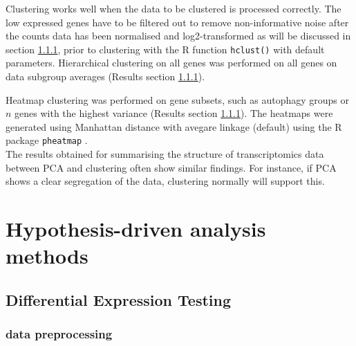     Clustering works well when the data to be clustered is processed correctly. The low expressed genes have to be filtered out to remove non-informative noise after the counts data has been normalised and log2-transformed as will be discussed in section \ref{}, prior to clustering with the R function \texttt{hclust()} with default parameters. Hierarchical clustering on all genes was performed on all genes on data subgroup averages (Results section \ref{}).
    
    Heatmap clustering was performed on gene subsets, such as autophagy groups or $n$ genes with the highest variance (Results section \ref{}). The heatmaps were generated using Manhattan distance with avegare linkage (default) using the R package  \texttt{pheatmap} \cite{kolde2012pheatmap}.\\
    
    The results obtained for summarising the structure of transcriptomics data between PCA and clustering often show similar findings. For instance, if PCA shows a clear segregation of the data, clustering normally will support this.
    
    
    
    
\newpage



\section{Hypothesis-driven analysis methods}    


    \subsection{Differential Expression Testing}
    
        \subsubsection{data preprocessing}
